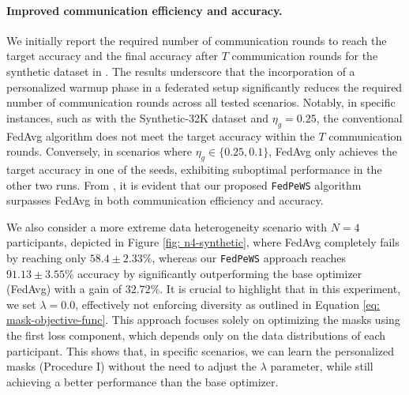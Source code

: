 \documentclass{article}
\begin{document}
\paragraph{Improved communication efficiency and accuracy.} We initially report the required number of communication rounds to reach the target accuracy and the final accuracy after $T$ communication rounds for the synthetic dataset in . The results underscore that the incorporation of a personalized warmup phase in a federated setup significantly reduces the required number of communication rounds across all tested scenarios. Notably, in specific instances, such as with the Synthetic-32K dataset and $\eta_g=0.25$, the conventional FedAvg algorithm does not meet the target accuracy within the $T$ communication rounds. Conversely, in scenarios where $\eta_g \in \{0.25, 0.1\}$, FedAvg only achieves the target accuracy in one of the seeds, exhibiting suboptimal performance in the other two runs. From , it is evident that our proposed \texttt{FedPeWS} algorithm surpasses FedAvg in both communication efficiency and accuracy. 

We also consider a more extreme data heterogeneity scenario with $N=4$ participants, depicted in Figure \ref{fig: n4-synthetic}, where FedAvg completely fails by reaching only $58.4\pm2.33\%$, whereas our \texttt{FedPeWS} approach reaches $91.13\pm3.55\%$ accuracy by significantly outperforming the base optimizer (FedAvg) with a gain of $\mathbf{32.72\%}$. It is crucial to highlight that in this experiment, we set $\lambda=0.0$, effectively not enforcing diversity as outlined in Equation \ref{eq: mask-objective-func}. This approach focuses solely on optimizing the masks using the first loss component, which depends only on the data distributions of each participant. This shows that, in specific scenarios, we can learn the personalized masks (Procedure I) without the need to adjust the $\lambda$ parameter, while still achieving a better performance than the base optimizer.
\end{document}
